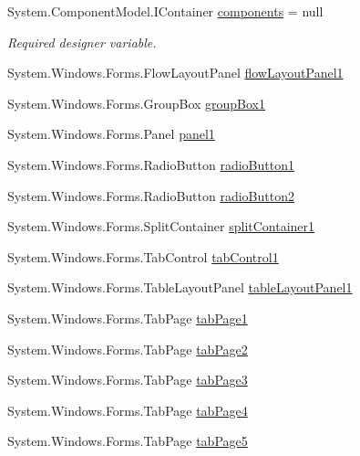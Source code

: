 \begin{DoxyCompactItemize}
\item 
System.\+Component\+Model.\+I\+Container \hyperlink{class__7___doroshenko__forms2__is52_1_1_win_container_ac98153f1a3cfbe59e072807f981ec444}{components} = null
\begin{DoxyCompactList}\small\item\em Required designer variable. \end{DoxyCompactList}\item 
System.\+Windows.\+Forms.\+Flow\+Layout\+Panel \hyperlink{class__7___doroshenko__forms2__is52_1_1_win_container_a8ade03b62bca2d0390e33025f4f8a3ad}{flow\+Layout\+Panel1}
\item 
System.\+Windows.\+Forms.\+Group\+Box \hyperlink{class__7___doroshenko__forms2__is52_1_1_win_container_a00d626e6bfbd21e22f70248e2a4e087a}{group\+Box1}
\item 
System.\+Windows.\+Forms.\+Panel \hyperlink{class__7___doroshenko__forms2__is52_1_1_win_container_a4217d152f7de608d85a79002f8b09c50}{panel1}
\item 
System.\+Windows.\+Forms.\+Radio\+Button \hyperlink{class__7___doroshenko__forms2__is52_1_1_win_container_ae3a18ea86ff584a7b04616112f6a711b}{radio\+Button1}
\item 
System.\+Windows.\+Forms.\+Radio\+Button \hyperlink{class__7___doroshenko__forms2__is52_1_1_win_container_ab01991af9d62b1039c6a8986c4d680ba}{radio\+Button2}
\item 
System.\+Windows.\+Forms.\+Split\+Container \hyperlink{class__7___doroshenko__forms2__is52_1_1_win_container_a702420d160deea79ce9d3399ae5b662b}{split\+Container1}
\item 
System.\+Windows.\+Forms.\+Tab\+Control \hyperlink{class__7___doroshenko__forms2__is52_1_1_win_container_ad4cdac4f2620168f3aa723ab79e9dad6}{tab\+Control1}
\item 
System.\+Windows.\+Forms.\+Table\+Layout\+Panel \hyperlink{class__7___doroshenko__forms2__is52_1_1_win_container_a0a48b3532f2ffc4c47bb6d93bdd6af96}{table\+Layout\+Panel1}
\item 
System.\+Windows.\+Forms.\+Tab\+Page \hyperlink{class__7___doroshenko__forms2__is52_1_1_win_container_aca48777ea62341bb88ec11effbc7dcde}{tab\+Page1}
\item 
System.\+Windows.\+Forms.\+Tab\+Page \hyperlink{class__7___doroshenko__forms2__is52_1_1_win_container_a279c130ac59759627efab7efd8787d28}{tab\+Page2}
\item 
System.\+Windows.\+Forms.\+Tab\+Page \hyperlink{class__7___doroshenko__forms2__is52_1_1_win_container_a09b3bb8245b2d153e3715f4af9fe602c}{tab\+Page3}
\item 
System.\+Windows.\+Forms.\+Tab\+Page \hyperlink{class__7___doroshenko__forms2__is52_1_1_win_container_a668bb67ae74294bf8d0c9d693ad407b1}{tab\+Page4}
\item 
System.\+Windows.\+Forms.\+Tab\+Page \hyperlink{class__7___doroshenko__forms2__is52_1_1_win_container_af352d1f3bdcb743839c129e0fbcb835f}{tab\+Page5}
\end{DoxyCompactItemize}


